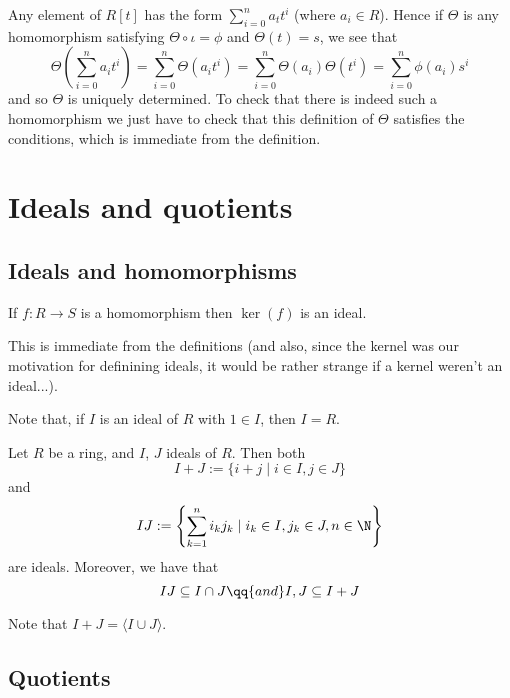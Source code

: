 \documentclass{maths}
\begin{document}
\begin{prf}
    Any element of $R[t]$ has the form $\sum_{i=0}^n a_t t^i$ (where $a_i\in R$).
    Hence if $\Theta$ is any homomorphism satisfying $\Theta\circ\iota=\phi$ and $\Theta(t)=s$, we see that
    \[
        \Theta\left(\sum_{i=0}^n a_i t^i\right) =
        \sum_{i=0}^n \Theta(a_i t^i) =
        \sum_{i=0}^n \Theta(a_i) \Theta(t^i) =
        \sum_{i=0}^n \phi(a_i) s^i
    \]
    and so $\Theta$ is uniquely determined.
    To check that there is indeed such a homomorphism we just have to check that this definition of $\Theta$ satisfies the conditions, which is immediate from the definition.
\end{prf}

\section{Ideals and quotients}
\subsection{Ideals and homomorphisms}

\begin{lem}
    If $f:R\to S$ is a homomorphism then $\ker(f)$ is an ideal.
\end{lem}

\begin{prf}
    This is immediate from the definitions (and also, since the kernel was our motivation for definining ideals, it would be rather strange if a kernel weren't an ideal...).
\end{prf}

\begin{rem}
    Note that, if $I$ is an ideal of $R$ with $1\in I$, then $I=R$.
\end{rem}

\begin{lem}
    Let $R$ be a ring, and $I$, $J$ ideals of $R$.
    Then both
    \[
        I + J :=
        \{i+j \mid i\in I,j\in J\}
    \]
    and
    \[
        IJ :=
        \left\{\sum_{k=1}^n i_k j_k \mid i_k\in I, j_k\in J, n\in\N\right\}
    \]
    are ideals.
    Moreover, we have that
    \[
        IJ\subseteq I\cap J \qq{and} I,J\subseteq I+J
    \]
\end{lem}

\begin{rem}
    Note that $I+J = \langle I\cup J\rangle$.
\end{rem}

\subsection{Quotients}
\end{document}
